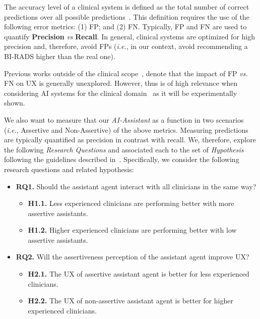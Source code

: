 The accuracy level of a clinical system is defined as the total number of correct predictions over all possible predictions~\cite{seref2019performance}.
This definition requires the use of the following error metrics:
(1) FP; and
(2) FN.
Typically, FP and FN are used to quantify {\bf Precision} {\it vs} {\bf Recall}.
In general, clinical systems are optimized for high precision and, therefore, avoid FPs ({\it i.e.}, in our context, avoid recommending a BI-RADS higher than the real one).

Previous works outside of the clinical scope~\cite{Kocielnik:2019:YAI:3290605.3300641, Dove:2017:UDI:3025453.3025739}, denote that the impact of FP {\it vs.} FN on UX is generally unexplored.
However, thus is of high relevance when considering AI systems for the clinical domain~\cite{boughey2016identification, dialani2015role} as it will be experimentally shown.

We also want to measure that our \textit{AI-Assistant} as a function in two scenarios ({\it i.e.}, Assertive and Non-Assertive) of the above metrics.
Measuring predictions are typically quantified as precision in contrast with recall.
We, therefore, explore the following {\it Research Questions} and associated each to the set of {\it Hypothesis} following the guidelines described in~\cite{10.1145/3290605.3300233, Kocielnik:2019:YAI:3290605.3300641}.
Specifically, we consider the following research questions and related hypothesis:

\begin{itemize}
\item {\bf RQ1.} Should the assistant agent interact with all clinicians in the same way?
\begin{itemize}
\item {\bf H1.1.} Less experienced clinicians are performing better with more assertive assistants.
\item {\bf H1.2.} Higher experienced clinicians are performing better with low assertive assistants.
\end{itemize}
\item {\bf RQ2.} Will the assertiveness perception of the assistant agent improve UX?
\begin{itemize}
\item {\bf H2.1.} The UX of assertive assistant agent is better for less experienced clinicians.
\item {\bf H2.2.} The UX of non-assertive assistant agent is better for higher experienced clinicians.
\end{itemize}
\end{itemize}

